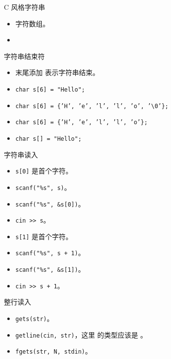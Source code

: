 \begin{frame}{C 风格字符串}
\begin{itemize}
    \item 字符数组。
    \item {}
\end{itemize}
\end{frame}

\begin{frame}{字符串结束符}
\begin{itemize}
    \item 末尾添加  表示字符串结束。
    \item \texttt{char s[6] = "Hello";}
    \item \texttt{char s[6] = \{'H', 'e', 'l', 'l', 'o', '\textbackslash 0'\};}
    \item \texttt{char s[6] = \{'H', 'e', 'l', 'l', 'o'\};}
    \item \texttt{char s[] = "Hello";}
\end{itemize}
\end{frame}

\begin{frame}{字符串读入}
\begin{itemize}
    \item \texttt{s[0]} 是首个字符。
    \item \texttt{scanf("\%s", s)}。
    \item \texttt{scanf("\%s", \&s[0])}。
    \item \texttt{cin >> s}。
\end{itemize}

\begin{itemize}
    \item \texttt{s[1]} 是首个字符。
    \item \texttt{scanf("\%s", s + 1)}。
    \item \texttt{scanf("\%s", \&s[1])}。
    \item \texttt{cin >> s + 1}。
\end{itemize}
\end{frame}

\begin{frame}{整行读入}
\begin{itemize}
    \item \texttt{gets(str)}。
    \item \texttt{getline(cin, str)}，这里  的类型应该是 。
    \item \texttt{fgets(str, N, stdin)}。
\end{itemize}
\end{frame}

